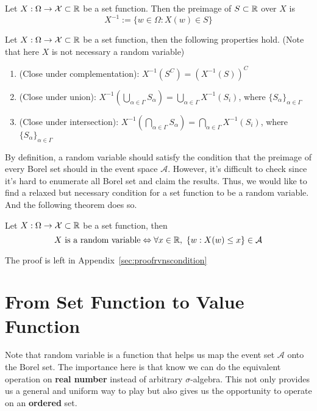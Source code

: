 \documentclass[Probability_Theory.tex]{subfiles}
\begin{document}
\begin{definition}
	Let $X:\Omega\rightarrow\mathcal{X}\subset{\mathbb R}$ be a set function. Then the preimage of $S\subset{\mathbb R}$ over $X$ is
	$$X^{-1}:=\{w\in\Omega:X(w)\in S \}$$
\end{definition}
\begin{property}\label{propertyofsetfuncs}
	Let $X:\Omega\rightarrow\mathcal{X}\subset{\mathbb R}$ be a set function, then the following properties hold. (Note that here $X$ is not necessary a random variable)
	\begin{enumerate}
		\item (Close under complementation): $X^{-1}(S^C) = (X^{-1}(S))^C$
		\item (Close under union): $X^{-1}(\bigcup_{\alpha\in\Gamma}S_{\alpha}) = \bigcup_{\alpha\in\Gamma}X^{-1}(S_i)$, where $\{S_{\alpha}\}_{\alpha\in\Gamma}$
		\item (Close under intersection): $X^{-1}(\bigcap_{\alpha\in\Gamma}S_{\alpha}) = \bigcap_{\alpha\in\Gamma}X^{-1}(S_i)$, where $\{S_{\alpha}\}_{\alpha\in\Gamma}$
	\end{enumerate}
\end{property}

By definition, a random variable should satisfy the condition that the preimage of every Borel set should in the event space $\mathcal{A}$. However, it's difficult to check since it's hard to enumerate all Borel set and claim the results. Thus, we would like to find a relaxed but necessary condition for a set function to be a random variable. And the following theorem does so.

\begin{theorem}\label{rvnscondition}
	Let $X:\Omega\rightarrow\mathcal{X}\subset{\mathbb R}$ be a set function, then
	$$X\mbox{ is a random variable}\Leftrightarrow \forall x\in{\mathbb R},\ \{w:X(w)\leq x\}\in\mathcal{A}$$
\end{theorem}
The proof is left in Appendix~\ref{sec:proofrvnscondition}

\section{From Set Function to Value Function}
Note that random variable is a function that helps us map the event set $\mathcal{A}$ onto the Borel set. The importance here is that know we can do the equivalent operation on {\bf real number} instead of arbitrary $\sigma$-algebra. This not only provides us a general and uniform way to play but also gives us the opportunity to operate on an {\bf ordered} set.
\end{document}

